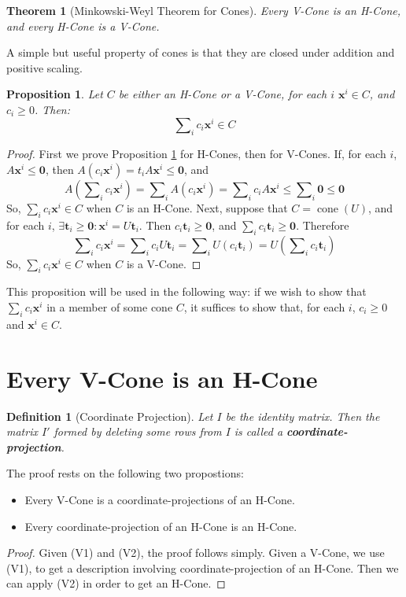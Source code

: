 \documentclass[fleqn]{article}
\renewcommand{\vec}[1]{\mathbf{#1}}
\DeclareMathOperator{\cone}{cone}
\newcommand{\0}{\vec{0}}
\newcommand{\x}{\vec{x}}
\renewcommand{\t}{\vec{t}}
\newcommand{\sumi}{\sum\nolimits_i}
\newtheorem{Def}{Definition}
\newtheorem{Thm}{Theorem}
\newtheorem{Prop}{Proposition}
\newcommand{\MWT}{Minkowski-Weyl Theorem }
\begin{document}
\begin{Thm}[\MWT for Cones]{
  Every V-Cone is an H-Cone, and every H-Cone is a V-Cone.
}\end{Thm}

A simple but useful property of cones is that they are closed under addition and positive scaling.

\begin{Prop}\label{prop:closure}
  Let $C$ be either an H-Cone or a V-Cone, for each $i$ $\x^i \in C$, and $c_i \geq 0$.  Then:
  \[ \sumi c_i \x^i \in C \]
\end{Prop}

\begin{proof}
  First we prove Proposition \ref{prop:closure} for H-Cones, then for V-Cones.
  If, for each $i$, $A\x^i \leq \0$, then $A(c_i\x^i) = t_iA\x^i \leq \0$, and
  \[ A\left(\sumi c_i\x^i\right) = \sumi A (c_i\x^i) = 
            \sumi c_i A\x^i \leq \sumi \0 \leq \0 \]
  So, $\sumi c_i\x^i \in C$ when $C$ is an H-Cone.  Next, suppose that $C = \cone(U)$, and for each $i$, $\exists \t_i \geq \0: \x^i = U\t_i$.  Then $c_i\t_i \geq \0$, and $\sumi c_i\t_i \geq \0$.  Therefore
  \[ \sumi c_i\x^i = \sumi c_i U\t_i = \sumi U(c_i\t_i) 
                   = U\left(\sumi c_i\t_i\right) \]
  So, $\sumi c_i\x^i \in C$ when $C$ is a V-Cone.
\end{proof}

This proposition will be used in the following way: if we wish to show that $\sumi c_i\x^i$ in a member of some cone $C$, it suffices to show that, for each $i$, $c_i \geq 0$ and $\x^i \in C$.

\newcommand{\Vcomp}{(V1)}
\newcommand{\Vproj}{(V2)}

\section{Every V-Cone is an H-Cone}

\begin{Def}[Coordinate Projection]{
  Let $I$ be the identity matrix.  Then the matrix $I'$ formed by deleting some rows from $I$ is called a \textbf{coordinate-projection}.
}\end{Def}

  The proof rests on the following two propostions:
  \begin{itemize}
  \item[\Vcomp] Every V-Cone is a coordinate-projections of an H-Cone.
  \item[\Vproj] Every coordinate-projection of an H-Cone is an H-Cone.
  \end{itemize}
\begin{proof}
  Given {\Vcomp} and {\Vproj}, the proof follows simply.  Given a V-Cone, we use {\Vcomp}, to get a description involving coordinate-projection of an H-Cone.  Then we can apply {\Vproj} in order to get an H-Cone.
\end{proof}
\end{document}
